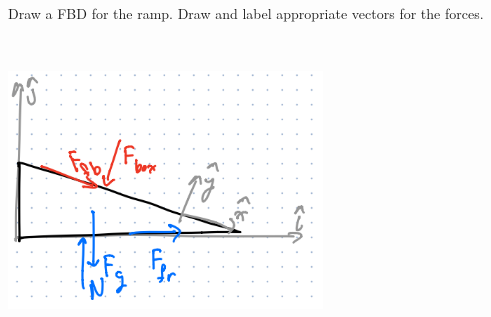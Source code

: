 Draw a FBD for the ramp. Draw and label appropriate vectors for the forces.

\begin{solution}\
\begin{center}
    \includegraphics[width=0.625\textwidth]{img/e10p2.png}
\end{center}
\end{solution}